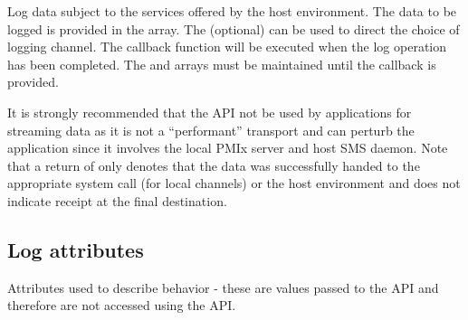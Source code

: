 \optattrend

\descr

Log data subject to the services offered by the host environment. The data to be logged is provided in the  array. The (optional)  can be used to direct the choice of logging channel.
The callback function will be executed when the log operation has been completed. The  and  arrays must be maintained until the callback is provided.

\adviceuserstart
It is strongly recommended that the  API not be used by applications for streaming data as it is not a ``performant'' transport and can perturb the application since it involves the local \ac{PMIx} server and host \ac{SMS} daemon. Note that a return of  only denotes that the data was successfully handed to the appropriate system call (for local channels) or the host environment and does not indicate receipt at the final destination.
\adviceuserend


\subsection{Log attributes}
\label{api:struct:attributes:log}

Attributes used to describe  behavior - these are values passed to the  \ac{API} and therefore are not accessed using the  \ac{API}.

